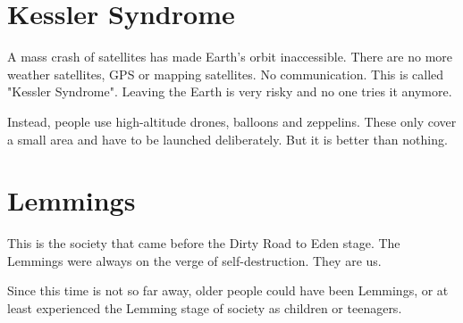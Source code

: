 \section{Kessler Syndrome}
\label{sec: Kessler Syndrome}
A mass crash of satellites has made Earth's orbit inaccessible. There are no more weather satellites, GPS or mapping satellites. No communication.
This is called "Kessler Syndrome". Leaving the Earth is very risky and no one tries it anymore.

Instead, people use high-altitude drones, balloons and zeppelins. These only cover a small area and have to be launched deliberately. But it is better than nothing.

\section{Lemmings}
\label{sec:Lemmings}

This is the society that came before the Dirty Road to Eden stage. The Lemmings were always on the verge of self-destruction. They are us.

Since this time is not so far away, older people could have been Lemmings, or at least experienced the Lemming stage of society as children or teenagers.